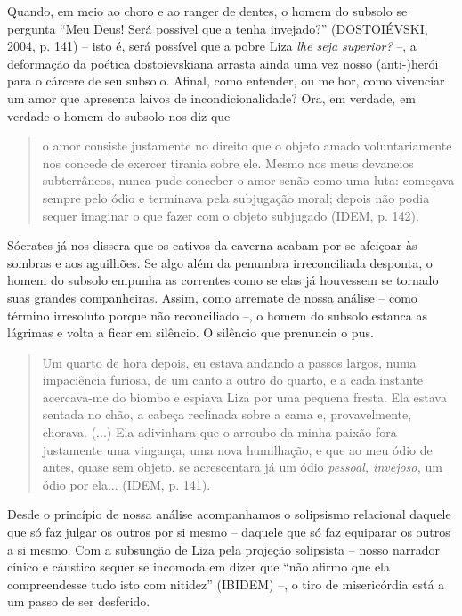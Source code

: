 Quando, em meio ao choro e ao ranger de dentes, o homem do subsolo se
pergunta ``Meu Deus! Será possível que a tenha invejado?'' (DOSTOIÉVSKI,
2004, p. 141) -- isto é, será possível que a pobre Liza \emph{lhe seja
superior?} --, a deformação da poética dostoievskiana arrasta ainda uma
vez nosso (anti-)herói para o cárcere de seu subsolo. Afinal, como
entender, ou melhor, como vivenciar um amor que apresenta laivos de
incondicionalidade? Ora, em verdade, em verdade o homem do subsolo nos
diz que

\begin{quote}
o amor consiste justamente no direito que o objeto amado voluntariamente
nos concede de exercer tirania sobre ele. Mesmo nos meus devaneios
subterrâneos, nunca pude conceber o amor senão como uma luta: começava
sempre pelo ódio e terminava pela subjugação moral; depois não podia
sequer imaginar o que fazer com o objeto subjugado (IDEM, p. 142).
\end{quote}

Sócrates já nos dissera que os cativos da caverna acabam por se afeiçoar
às sombras e aos aguilhões. Se algo além da penumbra irreconciliada
desponta, o homem do subsolo empunha as correntes como se elas já
houvessem se tornado suas grandes companheiras. Assim, como arremate de
nossa análise -- como término irresoluto porque não reconciliado --, o
homem do subsolo estanca as lágrimas e volta a ficar em silêncio. O
silêncio que prenuncia o pus.

\begin{quote}
Um quarto de hora depois, eu estava andando a passos largos, numa
impaciência furiosa, de um canto a outro do quarto, e a cada instante
acercava-me do biombo e espiava Liza por uma pequena fresta. Ela estava
sentada no chão, a cabeça reclinada sobre a cama e, provavelmente,
chorava. (...) Ela adivinhara que o arroubo da minha paixão fora
justamente uma vingança, uma nova humilhação, e que ao meu ódio de
antes, quase sem objeto, se acrescentara já um ódio \emph{pessoal,
invejoso,} um ódio por ela... (IDEM, p. 141).
\end{quote}

Desde o princípio de nossa análise acompanhamos o solipsismo relacional
daquele que só faz julgar os outros por si mesmo -- daquele que só faz
equiparar os outros a si mesmo. Com a subsunção de Liza pela projeção
solipsista -- nosso narrador cínico e cáustico sequer se incomoda em
dizer que ``não afirmo que ela compreendesse tudo isto com nitidez''
(IBIDEM) --, o tiro de misericórdia está a um passo de ser desferido.

